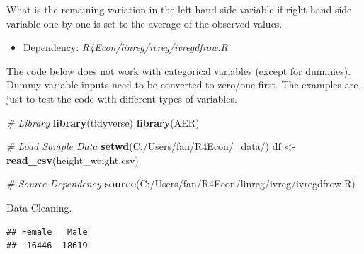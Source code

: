 \documentclass[
]{book}
\newenvironment{Shaded}{\begin{snugshade}}{\end{snugshade}}
\newcommand{\CommentTok}[1]{\textcolor[rgb]{0.56,0.35,0.01}{\textit{#1}}}
\newcommand{\DecValTok}[1]{\textcolor[rgb]{0.00,0.00,0.81}{#1}}
\newcommand{\KeywordTok}[1]{\textcolor[rgb]{0.13,0.29,0.53}{\textbf{#1}}}
\newcommand{\NormalTok}[1]{#1}
\newcommand{\OperatorTok}[1]{\textcolor[rgb]{0.81,0.36,0.00}{\textbf{#1}}}
\newcommand{\StringTok}[1]{\textcolor[rgb]{0.31,0.60,0.02}{#1}}
\providecommand{\tightlist}{%
  \setlength{\itemsep}{0pt}\setlength{\parskip}{0pt}}
\begin{document}
What is the remaining variation in the left hand side variable if right hand side variable one by one is set to the average of the observed values.

\begin{itemize}
\tightlist
\item
  Dependency: \emph{R4Econ/linreg/ivreg/ivregdfrow.R}
\end{itemize}

The code below does not work with categorical variables (except for dummies). Dummy variable inputs need to be converted to zero/one first. The examples are just to test the code with different types of variables.

\begin{Shaded}
\begin{Highlighting}[]
\CommentTok{\# Library}
\KeywordTok{library}\NormalTok{(tidyverse)}
\KeywordTok{library}\NormalTok{(AER)}

\CommentTok{\# Load Sample Data}
\KeywordTok{setwd}\NormalTok{(}\StringTok{\textquotesingle{}C:/Users/fan/R4Econ/\_data/\textquotesingle{}}\NormalTok{)}
\NormalTok{df \textless{}{-}}\StringTok{ }\KeywordTok{read\_csv}\NormalTok{(}\StringTok{\textquotesingle{}height\_weight.csv\textquotesingle{}}\NormalTok{)}

\CommentTok{\# Source Dependency}
\KeywordTok{source}\NormalTok{(}\StringTok{\textquotesingle{}C:/Users/fan/R4Econ/linreg/ivreg/ivregdfrow.R\textquotesingle{}}\NormalTok{)}
\end{Highlighting}
\end{Shaded}

Data Cleaning.

\begin{Shaded}
\end{Shaded}

\begin{verbatim}
## Female   Male 
##  16446  18619
\end{verbatim}
\end{document}
